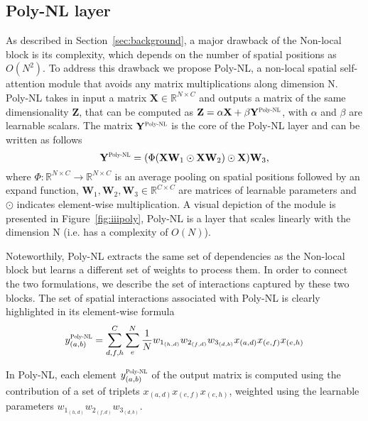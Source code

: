 \documentclass[10pt,twocolumn,letterpaper]{article}
\begin{document}
\subsection{Poly-NL layer}
As described in Section~\ref{sec:background}, a major drawback of the Non-local block is its complexity, which depends on the number of spatial positions as $O(N^2)$.
To address this drawback we propose Poly-NL, a non-local spatial self-attention module that avoids any matrix multiplications along dimension N.  Poly-NL takes in input a matrix $\mathbf{X} \in \mathbb{R}^{N \times C}$ and outputs a matrix of the same dimensionality $\mathbf{Z}$, that can be computed as $\mathbf{Z} = \alpha \mathbf{X} + \beta \mathbf{Y}^{\scalebox{.6}[.6]{Poly-NL}}$, with $\alpha$ and $\beta$ are learnable scalars. The matrix $\mathbf{Y}^{\scalebox{.6}[.6]{Poly-NL}}$ is the core of the Poly-NL layer and can be written as follows
\begin{equation}
\mathbf{Y}^{\scalebox{.6}[.6]{Poly-NL}} = (\Phi(\mathbf{X}\mathbf{W}_{1} \odot \mathbf{X}\mathbf{W}_{2} ) \odot \mathbf{X}) \mathbf{W}_{3},
\label{eqn:fast_nl}
\end{equation}
where $\Phi\colon\mathbb{R}^{N \times C} \to \mathbb{R}^{N \times C}$ is an average pooling on spatial positions followed by an expand function, $\mathbf{W}_{1},\mathbf{W}_{2}, \mathbf{W}_{3} \in \mathbb{R}^{C \times C}$ are matrices of learnable parameters and $\odot$ indicates element-wise multiplication. A visual depiction of the module is presented in Figure~\ref{fig:iiipoly}, Poly-NL is a layer that scales linearly with the dimension N (i.e. has a complexity of $O(N)$).

Noteworthily, Poly-NL extracts the same set of dependencies as the Non-local block but learns a different set of weights to process them. In order to connect the two formulations, we describe the set of interactions captured by these two blocks. 
The set of spatial interactions associated with Poly-NL is clearly highlighted in its element-wise formula
\begin{equation}
 y_{(a,b)}^{\scalebox{.6}[.6]{Poly-NL}}= \sum_{d,f,h}^{C}\sum_{e}^{N} \frac{1}{N} w_{1_{(h,d)}} w_{2_{(f,d)}} w_{3_{(d,b)}} x_{(a,d)} x_{(e,f)} x_{(e,h)} 
\label{eqn:fast_nl_element-wise}
\end{equation}

In Poly-NL, each element $y_{(a,b)}^{\scalebox{.6}[.6]{Poly-NL}}$ of the output matrix is computed using the contribution of a set of triplets $x_{(a,d)} x_{(e,f)} x_{(e,h)}$, weighted using the learnable parameters $w_{1_{(h,d)}} w_{2_{(f,d)}} w_{3_{(d,b)}}$. 
\end{document}
